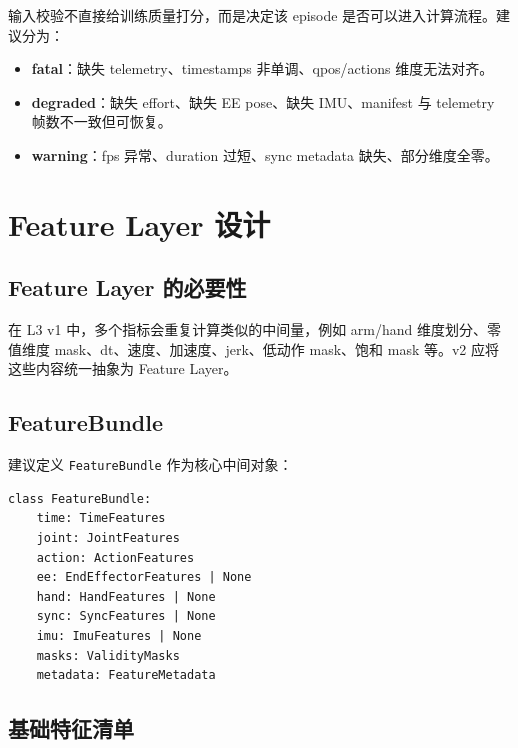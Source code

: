\documentclass[UTF8,zihao=-4]{ctexart}
\newcommand{\Code}[1]{\texttt{#1}}
\newcommand{\Term}[1]{\textbf{#1}}
\begin{document}
输入校验不直接给训练质量打分，而是决定该 episode 是否可以进入计算流程。建议分为：

\begin{itemize}
\item \Term{fatal}：缺失 telemetry、timestamps 非单调、qpos/actions 维度无法对齐。
\item \Term{degraded}：缺失 effort、缺失 EE pose、缺失 IMU、manifest 与 telemetry 帧数不一致但可恢复。
\item \Term{warning}：fps 异常、duration 过短、sync metadata 缺失、部分维度全零。
\end{itemize}

\section{Feature Layer 设计}

\subsection{Feature Layer 的必要性}

在 L3 v1 中，多个指标会重复计算类似的中间量，例如 arm/hand 维度划分、零值维度 mask、dt、速度、加速度、jerk、低动作 mask、饱和 mask 等。v2 应将这些内容统一抽象为 Feature Layer。

\subsection{FeatureBundle}

建议定义 \Code{FeatureBundle} 作为核心中间对象：

\begin{verbatim}
class FeatureBundle:
    time: TimeFeatures
    joint: JointFeatures
    action: ActionFeatures
    ee: EndEffectorFeatures | None
    hand: HandFeatures | None
    sync: SyncFeatures | None
    imu: ImuFeatures | None
    masks: ValidityMasks
    metadata: FeatureMetadata
\end{verbatim}

\subsection{基础特征清单}
\end{document}
